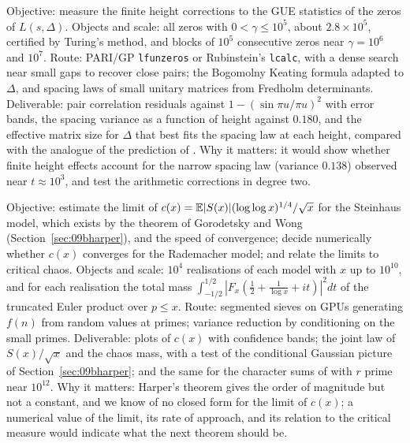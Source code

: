 \begin{compproblem}\label{cp:09bpair}
Objective: measure the finite height corrections to the GUE statistics of the zeros of $L(s,\Delta)$. Objects and scale: all zeros with $0<\gamma\le10^5$, about $2.8\times10^5$, certified by Turing's method, and blocks of $10^5$ consecutive zeros near $\gamma=10^6$ and $10^7$. Route: PARI/GP \texttt{lfunzeros} or Rubinstein's \texttt{lcalc}, with a dense search near small gaps to recover close pairs; the Bogomolny Keating formula \cite{bogomolnykeating1996} adapted to $\Delta$, and spacing laws of small unitary matrices from Fredholm determinants. Deliverable: pair correlation residuals against $1-(\sin\pi u/\pi u)^2$ with error bands, the spacing variance as a function of height against $0.180$, and the effective matrix size for $\Delta$ that best fits the spacing law at each height, compared with the analogue of the prediction of \cite{bblm2006}. Why it matters: it would show whether finite height effects account for the narrow spacing law (variance $0.138$) observed near $t\approx10^3$, and test the arithmetic corrections in degree two.
\end{compproblem}

\begin{compproblem}\label{cp:09bharper}
Objective: estimate the limit of $c(x)=\mathbb{E}|S(x)|(\log\log x)^{1/4}/\sqrt x$ for the Steinhaus model, which exists by the theorem of Gorodetsky and Wong (Section~\ref{sec:09bharper}), and the speed of convergence; decide numerically whether $c(x)$ converges for the Rademacher model; and relate the limits to critical chaos. Objects and scale: $10^4$ realisations of each model with $x$ up to $10^{10}$, and for each realisation the total mass $\int_{-1/2}^{1/2}|F_x(\frac12+\frac1{\log x}+it)|^2dt$ of the truncated Euler product over $p\le x$. Route: segmented sieves on GPUs generating $f(n)$ from random values at primes; variance reduction by conditioning on the small primes. Deliverable: plots of $c(x)$ with confidence bands; the joint law of $S(x)/\sqrt x$ and the chaos mass, with a test of the conditional Gaussian picture of Section~\ref{sec:09bharper}; and the same for the character sums of \cite{harper2023} with $r$ prime near $10^{12}$. Why it matters: Harper's theorem gives the order of magnitude but not a constant, and we know of no closed form for the limit of $c(x)$; a numerical value of the limit, its rate of approach, and its relation to the critical measure would indicate what the next theorem should be.
\end{compproblem}
